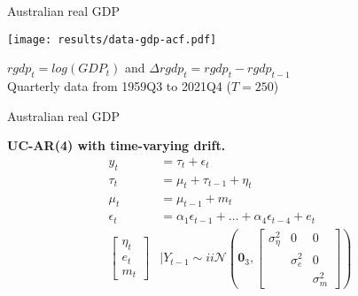 \documentclass[notes,blackandwhite,mathsans,usenames,dvipsnames]{beamer}
\begin{document}
\begin{frame}{Australian real GDP}

\centering
\texttt{[image: results/data-gdp-acf.pdf]}

\bigskip\small{\color{mcxs2}
$rgdp_t= log(GDP_t)$ and $\Delta rgdp_t= rgdp_t - rgdp_{t-1}$ \\
Quarterly data from 1959Q3 to 2021Q4 ($T=250$)}

\end{frame}









\begin{frame}{Australian real GDP}

\bigskip\textbf{UC-AR(4) with time-varying drift.}
\begin{align*}
y_t &= \tau_t + \epsilon_t\\[1ex]
\tau_t &= \mu_t + \tau_{t-1} + \eta_t\\[1ex]
\mu_t &= \mu_{t-1} + m_t\\[1ex]
\epsilon_t &= \alpha_1\epsilon_{t-1} + \dots + \alpha_4\epsilon_{t-4} +  e_t\\[2ex]
\begin{bmatrix}\eta_t \\ e_t\\ m_t\end{bmatrix}&\bigg|Y_{t-1} \sim ii\mathcal{N}\left(\mathbf{0}_3, \begin{bmatrix}\sigma_\eta^2 & 0 & 0 \\  & \sigma_e^2 &0 \\
&&\sigma_m^2\end{bmatrix} \right)
\end{align*}

\end{frame}
\end{document}
